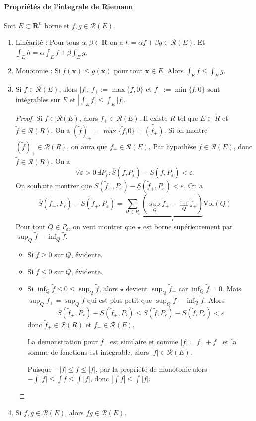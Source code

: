 \paragraph{Propriétés de l'integrale de Riemann}
Soit $E\subset \mathbf{R}^{n}$ borne et $f,g\in \mathcal{R}(E)$.
\begin{enumerate}
\item Linéarité : Pour tous $\alpha,\beta \in \mathbf{R}$ on a $h=\alpha f+\beta g\in \mathcal{R}(E)$. Et $\int _{E}h=\alpha \int _{E}f+\beta \int _{E}g$.
\item Monotonie : Si $f(\boldsymbol{x})\le g(\boldsymbol{x})$ pour tout $\boldsymbol{x}\in E$. Alors $\int _{E}f\le \int _{E}g$.
\item Si $f\in \mathcal{R}(E)$, alors $|f|$, $f_{+}:=\max\{ f,0 \}$ et $f_{-}:=\min\{ f,0 \}$ sont intégrables sur $E$ et $\left\lvert  \int _{E}f  \right\rvert\le \int _{E}|f|$.
\begin{proof}
Si $f\in \mathcal{R}(E)$, alors $f_{+}\in \mathcal{R}(E)$. Il existe $R$ tel que $E\subset \mathring{R}$ et $\tilde{f}\in \mathcal{R}(R)$. On a $(\tilde{f})_{+}=\max\{ \tilde{f},0 \}=\widetilde{(f_{+})}$. Si on montre $(\tilde{f})_{+}\in \mathcal{R}(R)$, on aura que $f_{+}\in \mathcal{R}(E)$. Par hypothèse $f\in \mathcal{R}(E)$, donc $\tilde{f}\in \mathcal{R}(R)$. On a
$$
\forall\varepsilon>0\,\exists P_{\varepsilon}:\overline{S}(\tilde{f},P_{\varepsilon})-\underline{S}(\tilde{f},P_{\varepsilon})< \varepsilon.
$$
On souhaite montrer que $\overline{S}(\tilde{f}_{+},P_{\varepsilon})-\underline{S}(\tilde{f}_{+},P_{\varepsilon})<\varepsilon$.  On a
$$
\overline{S}(\tilde{f}_{+},P_{\varepsilon})-\underline{S}(\tilde{f}_{+},P_{\varepsilon}) =\sum _{Q\in P_{\varepsilon}}\underbrace{ (\sup_{Q}\tilde{f}_{+}- \inf_{Q}\tilde{f}_{+} ) }_{ \star }\mathrm{Vol}(Q)
$$
Pour tout $Q\in P_{\varepsilon}$, on veut montrer que $\star$ est borne supérieurement par $\sup_{Q}\tilde{f}-\inf_{Q}\tilde{f}$.
\begin{itemize}
\item Si $\tilde{f}\ge 0$ sur $Q$, évidente.
\item Si $\tilde{f}\le 0$ sur $Q$, évidente.
\item Si $\inf_{Q}\tilde{f}\le 0 \le \sup_{Q}\tilde{f}$, alors $\star$ devient $\sup_{Q}\tilde{f}_{+}$ car $\inf_{Q}\tilde{f}=0$. Mais $\sup_{Q}\tilde{f}_{+}=\sup_{Q}\tilde{f}$ qui est plus petit que $\sup_{Q}\tilde{f}-\inf_{Q}\tilde{f}$. Alors
$$
\overline{S}(\tilde{f}_{+},P_{\varepsilon})-\underline{S}(\tilde{f}_{+},P_{\varepsilon})\le \overline{S}(\tilde{f},P_{\varepsilon})-\underline{S}(\tilde{f},P_{\varepsilon})<\varepsilon
$$
donc $\tilde{f}_{+}\in \mathcal{R}(R)$ et $f_{+}\in \mathcal{R}(E)$.

La demonstration pour $f_{-}$ est similaire et comme $|f|=f_{+}+f_{-}$ et la somme de fonctions est integrable, alors $|f|\in \mathcal{R}(E)$.

Puisque $-|f|\le f \le |f|$, par la propriété de monotonie alors $-\int |f|\le\int f\le\int |f|$, donc $|\int f|\le\int |f|$.
\end{itemize}
\end{proof}
\item Si $f,g\in \mathcal{R}(E)$, alors $fg\in \mathcal{R}(E)$.
\end{enumerate}

